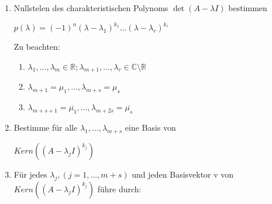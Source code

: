 \documentclass[twoside]{article}
\begin{document}
				\begin{enumerate}[1.]
					\item Nullstelen des charakteristischen Polynoms \begin{math} \det(A-\lambda I) \end{math} bestimmen
						
						\begin{math}
							p(\lambda) = (-1)^n (\lambda - \lambda_1)^{k_1} \dots (\lambda - \lambda_r)^{k_r}
						\end{math}
						
						Zu beachten:
						
						\begin{enumerate}[]
							
							\item \begin{math} \lambda_1, \dots, \lambda_m \in \mathbb{R}; \lambda_{m+1}, \dots, \lambda_r \in \mathbb{C} \setminus \mathbb{R} \end{math}
							
							\item \begin{math} \lambda_{m+1} = \mu_1, \dots, \lambda_{m+s} = \mu_s \end{math}
							
							\item \begin{math} \lambda_{m+s+1} = \overline{\mu_1}, \dots, \lambda_{m+2s} = \overline{\mu_s} \end{math}
						
						\end{enumerate}
							
					\item Bestimme für alle \begin{math} \lambda_1, \dots, \lambda_{m+s} \end{math} eine Basis von
						
						\begin{math}
							Kern((A-\lambda_j I)^{k_j})
						\end{math}
					
					\item Für jedes \begin{math} \lambda_j, (j = 1, \dots, m + s) \end{math} und jeden Basisvektor v von \begin{math} Kern((A-\lambda_j I)^{k_j}) \end{math} führe durch:
					

\end{enumerate}
\end{document}
